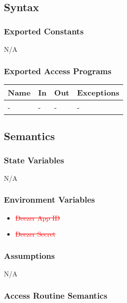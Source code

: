 \documentclass[12pt, titlepage]{article}
\begin{document}
\subsection{Syntax}

\subsubsection{Exported Constants}
N/A

\subsubsection{Exported Access Programs}

\begin{center}
\begin{tabular}{p{2cm} p{4cm} p{4cm} p{2cm}}
\hline
\textbf{Name} & \textbf{In} & \textbf{Out} & \textbf{Exceptions}\\
\hline%
- &- &- &-\\ 
\hline
\end{tabular}
\end{center}

\subsection{Semantics}

\subsubsection{State Variables}
N/A

\subsubsection{Environment Variables}
\begin{itemize}
  \item \textcolor{red}{\sout{Deezer App ID}}
  \item \textcolor{red}{\sout{Deezer Secret}}
\end{itemize}

\subsubsection{Assumptions}
N/A

\subsubsection{Access Routine Semantics}
\end{document}
